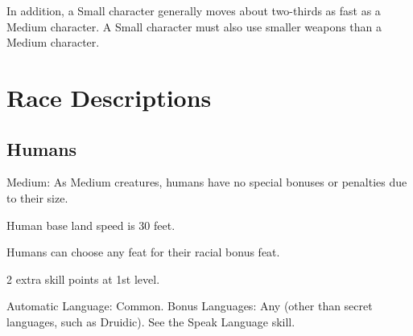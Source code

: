 In addition, a Small character generally moves about two-thirds as fast as a Medium character. A Small character must also use smaller weapons than a Medium character.

\section{Race Descriptions}

\subsection{Humans}
\begin{itemize*}
\item Medium: As Medium creatures, humans have no special bonuses or penalties due to their size.
\item Human base land speed is 30 feet.
\item Humans can choose any feat for their racial bonus feat.
\item 2 extra skill points at 1st level.
\item Automatic Language: Common. Bonus Languages: Any (other than secret languages, such as Druidic). See the Speak Language skill.
\end{itemize*}

